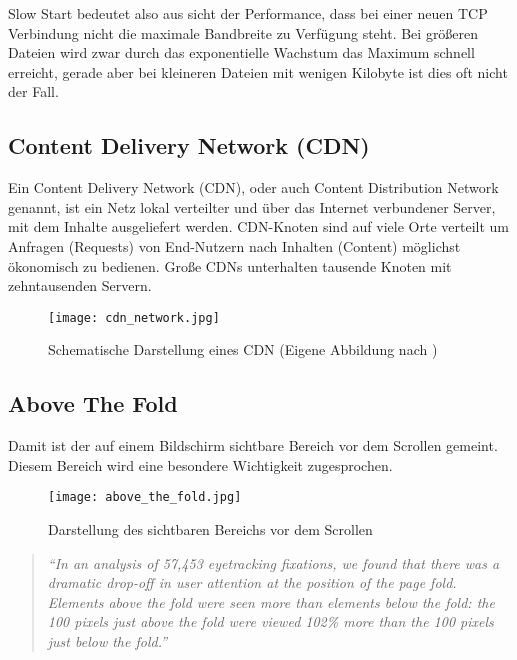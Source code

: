 		Slow Start bedeutet also aus sicht der Performance, dass bei einer neuen TCP Verbindung nicht die maximale Bandbreite zu Verfügung steht. Bei größeren Dateien wird zwar durch das exponentielle Wachstum das Maximum schnell erreicht, gerade aber bei kleineren Dateien mit wenigen Kilobyte ist dies oft nicht der Fall.



	\subsection{Content Delivery Network (CDN)} %
	\label{sub:content_delivery_network}
		Ein Content Delivery Network (CDN), oder auch Content Distribution Network genannt, ist ein Netz lokal verteilter und über das Internet verbundener Server, mit dem Inhalte ausgeliefert werden. CDN-Knoten sind auf viele Orte verteilt um Anfragen (Requests) von End-Nutzern nach Inhalten (Content) möglichst ökonomisch zu bedienen. Große CDNs unterhalten tausende Knoten mit zehntausenden Servern.\autocite{wikipediaCDN}

		\begin{figure}[htbp]
			\begin{center}
				\texttt{[image: cdn\_network.jpg]}
				\caption{Schematische Darstellung eines CDN (Eigene Abbildung nach \autocite{ritz14})}
				\label{fig:cdn_network}
			\end{center}
		\end{figure}
		


	\subsection{Above The Fold} %
	\label{sub:above_the_fold}
		Damit ist der auf einem Bildschirm sichtbare Bereich vor dem Scrollen gemeint. Diesem Bereich wird eine besondere Wichtigkeit zugesprochen.
		\begin{figure}[htbp]
			\begin{center}
				\texttt{[image: above\_the\_fold.jpg]}
				\caption{Darstellung des sichtbaren Bereichs vor dem Scrollen}
				\label{fig:above_the_fold}
			\end{center}
		\end{figure}

		\begin{quote}
			 \textit{"`In an analysis of 57,453 eyetracking fixations, we found that there was a dramatic drop-off in user attention at the position of the page fold. Elements above the fold were seen more than elements below the fold: the 100 pixels just above the fold were viewed 102\% more than the 100 pixels just below the fold."'} \autocite{nng15}
		\end{quote}

